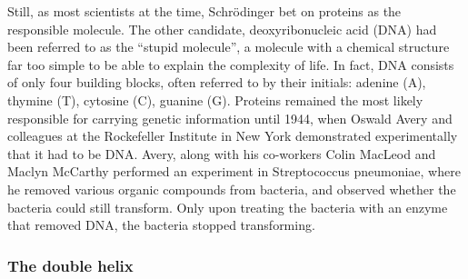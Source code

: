 Still, as most scientists at the time, Schrödinger bet on proteins as the responsible molecule. 
The other candidate, deoxyribonucleic acid (DNA) had been referred to as the “stupid molecule”, a molecule with a chemical structure far too simple to be able to explain the complexity of life. 
In fact, DNA consists of only four building blocks, often referred to by their initials: adenine (A), thymine (T), cytosine (C), guanine (G).
\vspace{4mm}
Proteins remained the most likely responsible for carrying genetic information until 1944, when Oswald Avery and colleagues at the Rockefeller Institute in New York demonstrated experimentally that it had to be DNA.
Avery, along with his co-workers Colin MacLeod and Maclyn McCarthy performed an experiment in Streptococcus pneumoniae, where he removed various organic compounds from bacteria, and observed whether the bacteria could still transform. 
Only upon treating the bacteria with an enzyme that removed DNA, the bacteria stopped transforming.

\subsubsection{The double helix}

